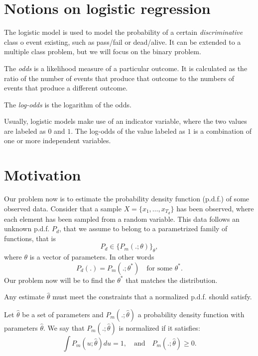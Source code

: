 \section{Notions on logistic regression}

The logistic model is used to model the probability of a certain \emph{discriminative} class o event existing, such as pass/fail or dead/alive. It can be extended to a multiple class problem, but we will focus on the binary problem.

\begin{ndef}
The \emph{odds} is a likelihood measure of a particular outcome. It is calculated as the ratio of the number of events that produce that outcome to the numbers of events that produce a different outcome.

The \emph{log-odds} is the logarithm of the odds.
\end{ndef}

Usually, logistic models make use of an indicator variable, where the two values are labeled as $0$ and $1$. The log-odds of the value labeled as $1$ is a combination of one or more independent variables.
 

\label{Chapter:NCE}

\section{Motivation}

Our problem now is to estimate the probability density function (p.d.f.) of some observed data. Consider that a sample $X = \{x_1,\dots,x_{T_d}\}$  has been observed, where each element has been sampled from a random variable. This data follows an unknown p.d.f. $P_d$, that we assume to belong to a parametrized family of functions, that is
\[
P_d \in \{P_m(.;\theta)\}_\theta,
\]
where $\theta$ is a vector of parameters. In other words
$$
P_d(.) = P_m(.;\theta^*) \quad \text{for some } \theta^*.
$$
Our problem now will be to find the $\theta^*$ that matches the distribution. 

Any estimate $\hat{\theta}$ must meet the constraints that a normalized p.d.f. should satisfy.


\begin{ndef}
Let $\hat{\theta}$ be a set of parameters and $P_m(.;\hat{\theta})$ a probability density function with parameters $\hat{\theta}$. We say that $P_m(.;\hat{\theta})$ is normalized if it satisfies:
$$
\int P_m(u;\hat{\theta})du = 1, \quad \text{and}\quad P_m(.;\hat{\theta})\geq 0.
$$
\end{ndef}

